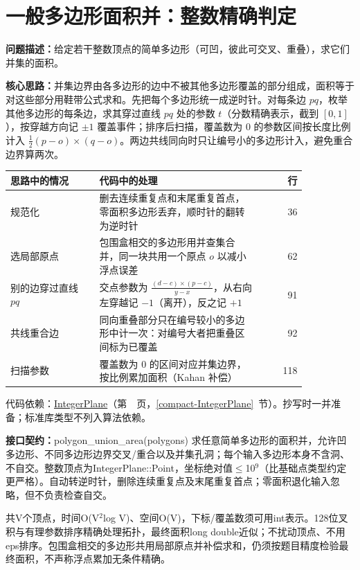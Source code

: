 \section{一般多边形面积并：整数精确判定}\label{compact-polygon_union_area}

\noindent\textbf{问题描述：}\allowbreak 给定若干整数顶点的简单多边形（可凹，彼此可交叉、重叠），求它们并集的面积。

\textbf{核心思路：}\allowbreak 并集边界由各多边形的边中不被其他多边形覆盖的部分组成，面积等于对这些部分用鞋带公式求和。先把每个多边形统一成逆时针。对每条边 $pq$，枚举其他多边形的每条边，求其穿过直线 $pq$ 处的参数 $t$（分数精确表示，截到 $[0,1]$），按穿越方向记 $\pm1$ 覆盖事件；排序后扫描，覆盖数为 0 的参数区间按长度比例计入 $\frac12(p-o)\times(q-o)$。两边共线同向时只让编号小的多边形计入，避免重合边界算两次。

\begin{center}\small
\begin{tabular}{@{}p{0.30\linewidth}p{0.55\linewidth}r@{}}
\toprule
思路中的情况 & 代码中的处理 & 行\\
\midrule
规范化 & 删去连续重复点和末尾重复首点，零面积多边形丢弃，顺时针的翻转为逆时针 & 36\\
选局部原点 & 包围盒相交的多边形用并查集合并，同一块共用一个原点 $o$ 以减小浮点误差 & 62\\
别的边穿过直线 $pq$ & 交点参数为 $\frac{(d-c)\times(p-c)}{y-x}$，从右向左穿越记 $-1$（离开），反之记 $+1$ & 91\\
共线重合边 & 同向重叠部分只在编号较小的多边形中计一次：对编号大者把重叠区间标为已覆盖 & 92\\
扫描参数 & 覆盖数为 0 的区间对应并集边界，按比例累加面积（Kahan 补偿） & 118\\
\bottomrule
\end{tabular}
\end{center}

代码依赖：\hyperref[compact-IntegerPlane]{IntegerPlane}（第~\pageref{compact-IntegerPlane}~页，\ref{compact-IntegerPlane}~节）。抄写时一并准备；标准库类型不列入算法依赖。

{\sloppy{}\noindent\textbf{接口契约：}polygon\_union\_area(polygons) 求任意简单多边形的面积并，允许凹多边形、不同多边形边界交叉/重合以及并集孔洞；每个输入多边形本身不含洞、不自交。整数顶点为IntegerPlane::Point，坐标绝对值$\le$10$^{9}$（比基础点类型约定更严格）。自动转逆时针，删除连续重复点及末尾重复首点；零面积退化输入忽略，但不负责检查自交。

共V个顶点，时间O(V$^{2}$log V)、空间O(V)，下标/覆盖数须可用int表示。128位叉积与有理参数排序精确处理拓扑，最终面积long double近似；不扰动顶点、不用eps排序。包围盒相交的多边形共用局部原点并补偿求和，仍须按题目精度检验最终面积，不声称浮点累加无条件精确。\par}

